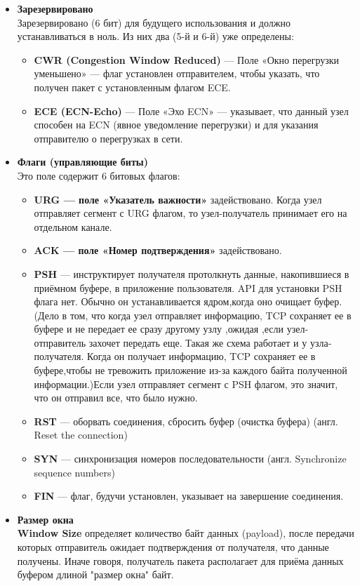 \begin{itemize}
\item \textbf{Зарезервировано}\\
Зарезервировано (6 бит) для будущего использования и должно устанавливаться в ноль. Из них два (5-й и 6-й) уже определены:
\begin{itemize}
    \item \textbf{CWR (Congestion Window Reduced)} — Поле «Окно перегрузки уменьшено» — флаг установлен отправителем, чтобы указать, что получен пакет с установленным флагом ECE.
    \item \textbf{ECE (ECN-Echo)} — Поле «Эхо ECN» — указывает, что данный узел способен на ECN (явное уведомление перегрузки) и для указания отправителю о перегрузках в сети.
\end{itemize}

\item \textbf{Флаги (управляющие биты)}\\
Это поле содержит 6 битовых флагов:
\begin{itemize}
    \item \textbf{URG — поле «Указатель важности»} задействовано. Когда узел отправляет сегмент с URG флагом, то узел-получатель принимает его на отдельном канале.
    \item \textbf{ACK — поле «Номер подтверждения»} задействовано.
    \item \textbf{PSH} — инструктирует получателя протолкнуть данные, накопившиеся в приёмном буфере, в приложение пользователя. API для установки PSH флага нет. Обычно он устанавливается ядром,когда оно очищает буфер.(Дело в том, что когда узел отправляет информацию, TCP сохраняет ее в буфере и не передает ее сразу другому узлу ,ожидая ,если узел-отправитель захочет передать еще. Такая же схема работает и у узла-получателя. Когда он получает информацию, TCP сохраняет ее в буфере,чтобы не тревожить приложение из-за каждого байта полученной информации.)Если узел отправляет сегмент с PSH флагом, это значит, что он отправил все, что было нужно.
    \item \textbf{RST} — оборвать соединения, сбросить буфер (очистка буфера) (англ. Reset the connection)
    \item \textbf{SYN} — синхронизация номеров последовательности (англ. Synchronize sequence numbers)
    \item \textbf{FIN} — флаг, будучи установлен, указывает на завершение соединения.
\end{itemize}

\item \textbf{Размер окна}\\
\textbf{Window Size} определяет количество байт данных (payload), после передачи которых отправитель ожидает подтверждения от получателя, что данные получены. Иначе говоря, получатель пакета располагает для приёма данных буфером длиной "размер окна" байт.\\



\end{itemize}
